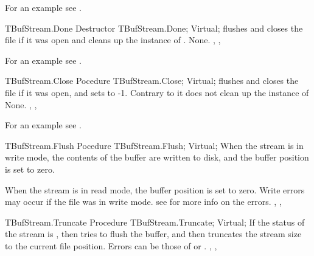 For an example see .

\begin{procedure}{TBufStream.Done}
\Declaration
Destructor TBufStream.Done; Virtual;
\Description
{} flushes and closes the file if it was open and cleans up the 
instance of . 
\Errors
None.
\SeeAlso
{}, ,
\end{procedure}

For an example see .

\begin{procedure}{TBufStream.Close}
\Declaration
Pocedure TBufStream.Close; Virtual;
\Description
{} flushes and closes the file if it was open, and sets  to -1. 
Contrary to  it does not clean up the instance
of 
\Errors
None.
\SeeAlso
{}, ,
\end{procedure}

For an example see .

\begin{procedure}{TBufStream.Flush}
\Declaration
Pocedure TBufStream.Flush; Virtual;
\Description
When the stream is in write mode, the contents of the buffer are written to
disk, and the buffer position is set to zero.

When the stream is in read mode, the buffer position is set to zero.
\Errors
Write errors may occur if the file was in write mode.
see  for more info on the errors.
\SeeAlso
{}, ,
\end{procedure}

\html{}

\begin{procedure}{TBufStream.Truncate}
\Declaration
Procedure TBufStream.Truncate; Virtual;
\Description
If the status of the stream is , then  tries to
flush the buffer, and then truncates the stream size to the current 
file position.
\Errors
Errors can be those of  or
.
\SeeAlso
{}, ,
\end{procedure}


